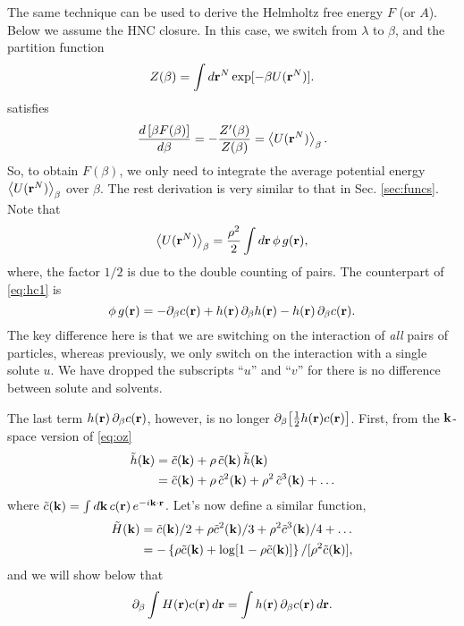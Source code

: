 \documentclass[12pt]{article}
\begin{document}
The same technique can be used to derive the Helmholtz free energy $F$ (or $A$).
%
Below we assume the HNC closure.
%
In this case, we switch from $\lambda$ to $\beta$,
and the partition function
%
\begin{equation}
  Z(\beta) = \int d\mathbf{r}^N \exp[-\beta U(\mathbf{r}^N)].
  \label{eq:partfunc_beta}
\end{equation}
%
satisfies
\begin{align*}
  \frac{ d \left[ \beta F(\beta) \right] }
  { d \beta }
  = -\frac{ Z'(\beta) }{Z(\beta)}
  = \left\langle
      U(\mathbf{r}^N)
    \right\rangle_\beta.
\end{align*}
%
So, to obtain $F(\beta)$, we only need to integrate
  the average potential energy
  $\left\langle U(\mathbf{r}^N) \right\rangle_\beta$
  over $\beta$.
%
The rest derivation is very similar to that in Sec. \ref{sec:funcs}.
%
Note that
%
\begin{equation}
  \left\langle
    U(\mathbf{r}^N)
  \right\rangle_\beta
  =
  \frac{\rho^2}{2} \int d \mathbf{r} \, \phi \, g(\mathbf{r}),
\end{equation}
%
where, the factor $1/2$ is due to the double counting of pairs.
%
The counterpart of \eqref{eq:hc1} is
%
\begin{equation}
  \phi \, g(\mathbf{r})
  =
  - \partial_\beta c(\mathbf{r}) + h(\mathbf{r}) \, \partial_\beta h(\mathbf{r}) - h(\mathbf{r}) \, \partial_\beta c(\mathbf{r}).
  \label{eq:hcall}
\end{equation}
%
The key difference here is that we are switching on the interaction
  of \emph{all} pairs of particles, whereas previously, we only switch on
  the interaction with a single solute $u$.
%
We have dropped the subscripts ``$u$'' and ``$v$'' for there is no
  difference between solute and solvents.


The last term $h(\mathbf{r}) \, \partial_\beta c(\mathbf{r})$, however,
  is no longer $\partial_\beta \big[ \frac{1}{2} h(\mathbf{r}) c(\mathbf{r}) \big]$.
%
First, from the $\mathbf{k}$-space version of \eqref{eq:oz}
\begin{align*}
  \tilde{h}(\mathbf{k})
  &= \tilde{c}(\mathbf{k}) + \rho \, \tilde{c}(\mathbf{k}) \, \tilde{h}(\mathbf{k}) \\
  &= \tilde{c}(\mathbf{k}) + \rho \, \tilde{c}^2(\mathbf{k})
               + \rho^2 \, \tilde{c}^3(\mathbf{k})
               + \dots
\end{align*}
%
where $\tilde{c}(\mathbf{k}) = \int d\mathbf{k} \, c(\mathbf{r}) \, e^{-i \mathbf{k}\cdot\mathbf{r}}$.
%
Let's now define a similar function,
%
\begin{align*}
  \tilde{H}(\mathbf{k})
  &= \tilde{c}(\mathbf{k})/2
   + \rho \tilde{c}^2(\mathbf{k})/3
   + \rho^2 \tilde{c}^3(\mathbf{k})/4
    + \dots \\
  &= -\left\{
        \rho \tilde{c}(\mathbf{k})
        + \log[1 - \rho \tilde{c}(\mathbf{k})]
    \right\} / [\rho^2 \tilde{c}(\mathbf{k})],
\end{align*}
%
and we will show below that
\begin{equation}
  \partial_\beta \int H(\mathbf{r}) c(\mathbf{r}) \, d \mathbf{r}
  = \int h(\mathbf{r}) \, \partial_\beta c(\mathbf{r}) \, d \mathbf{r}.
  \label{eq:bigH}
\end{equation}
\end{document}
